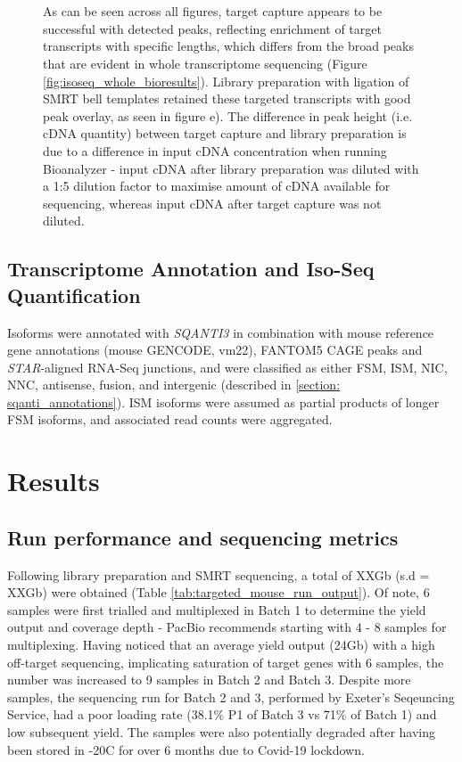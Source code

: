 \begin{figure}[!htp]
{	\\
	\\
	As can be seen across all figures, target capture appears to be successful with detected peaks, reflecting enrichment of target transcripts with specific lengths, which differs from the broad peaks that are evident in whole transcriptome sequencing (Figure \ref{fig:isoseq_whole_bioresults}). Library preparation with ligation of SMRT bell templates retained these targeted transcripts with good peak overlay, as seen in figure e). The difference in peak height (i.e. cDNA quantity) between target capture and library preparation is due to a difference in input cDNA concentration when running Bioanalyzer - input cDNA after library preparation was diluted with a 1:5 dilution factor to maximise amount of cDNA available for sequencing, whereas input cDNA after target capture was not diluted.}  
	\label{fig:isoseq_targeted_libresults}
\end{figure}


\subsection{Transcriptome Annotation and Iso-Seq Quantification}
Isoforms were annotated with \textit{SQANTI3} in combination with mouse reference gene annotations (mouse GENCODE, vm22), FANTOM5 CAGE peaks and \textit{STAR}-aligned RNA-Seq junctions, and were classified as either FSM, ISM, NIC, NNC, antisense, fusion, and intergenic (described in \cref{section: sqanti_annotations}). ISM isoforms were assumed as partial products of longer FSM isoforms, and associated read counts were aggregated.   

\newpage
\section{Results}
\subsection{Run performance and sequencing metrics}
Following library preparation and SMRT sequencing, a total of XXGb (s.d = XXGb) were obtained (Table \ref{tab:targeted_mouse_run_output}). Of note, 6 samples were first trialled and multiplexed in Batch 1 to determine the yield output and coverage depth - PacBio recommends starting with 4 - 8 samples for multiplexing. Having noticed that an average yield output (24Gb) with a high off-target sequencing, implicating saturation of target genes with 6 samples, the number was increased to 9 samples in Batch 2 and Batch 3. Despite more samples, the sequencing run for Batch 2 and 3, performed by Exeter's Seqeuncing Service, had a poor loading rate (38.1\% P1 of Batch 3 vs 71\% of Batch 1) and low subsequent yield. The samples were also potentially degraded after having been stored in -20\textdegree C for over 6 months due to Covid-19 lockdown. 

